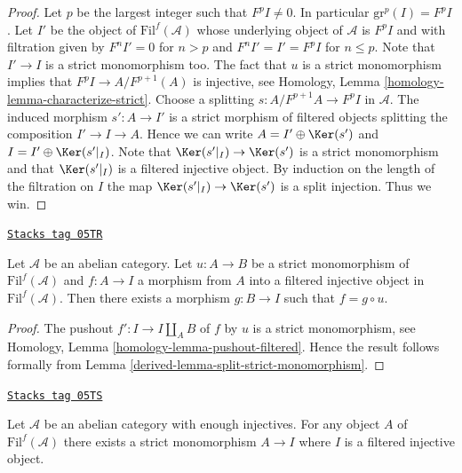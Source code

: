 \begin{proof}
Let $p$ be the largest integer such that $F^pI \not = 0$.
In particular $\text{gr}^p(I) = F^pI$.
Let $I'$ be the object of $\text{Fil}^f(\mathcal{A})$ whose
underlying object of $\mathcal{A}$ is $F^pI$ and with filtration
given by $F^nI' = 0$ for $n > p$ and $F^nI' = I' = F^pI$ for
$n \leq p$. Note that $I' \to I$ is a strict monomorphism too.
The fact that $u$ is a strict monomorphism implies that
$F^pI \to A/F^{p + 1}(A)$ is injective, see
Homology, Lemma \ref{homology-lemma-characterize-strict}.
Choose a splitting $s : A/F^{p + 1}A \to F^pI$ in $\mathcal{A}$.
The induced morphism $s' : A \to I'$ is a strict morphism of
filtered objects splitting the composition $I' \to I \to A$.
Hence we can write $A = I' \oplus \Ker(s')$ and
$I = I' \oplus \Ker(s'|_I)$. Note that
$\Ker(s'|_I) \to \Ker(s')$ is a strict monomorphism
and that $\Ker(s'|_I)$ is a filtered injective object.
By induction on the length of the filtration on $I$ the map
$\Ker(s'|_I) \to \Ker(s')$ is a split injection.
Thus we win.
\end{proof}

\begin{lemma}
\label{derived-lemma-injective-property-filtered-injective}
\href{https://stacks.math.columbia.edu/tag/05TR}{\texttt{Stacks tag 05TR}}

Let $\mathcal{A}$ be an abelian category.
Let $u : A \to B$ be a strict monomorphism
of $\text{Fil}^f(\mathcal{A})$
and $f : A \to I$ a morphism from $A$ into a filtered injective object
in $\text{Fil}^f(\mathcal{A})$.
Then there exists a morphism $g : B \to I$ such that $f = g \circ u$.
\end{lemma}

\begin{proof}

The pushout $f' : I \to I \amalg_A B$ of $f$ by $u$ is a strict
monomorphism, see
Homology, Lemma \ref{homology-lemma-pushout-filtered}.
Hence the result follows formally from
Lemma \ref{derived-lemma-split-strict-monomorphism}.
\end{proof}

\begin{lemma}
\label{derived-lemma-strict-monomorphism-into-filtered-injective}
\href{https://stacks.math.columbia.edu/tag/05TS}{\texttt{Stacks tag 05TS}}

Let $\mathcal{A}$ be an abelian category with enough injectives.
For any object $A$ of $\text{Fil}^f(\mathcal{A})$ there exists
a strict monomorphism $A \to I$
where $I$ is a filtered injective object.
\end{lemma}

